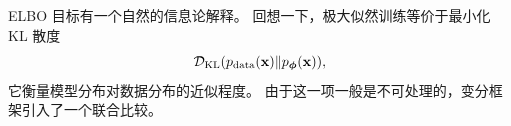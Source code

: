 






ELBO 目标有一个自然的信息论解释。
回想一下，极大似然训练等价于最小化 KL 散度
\[
\mathcal{D}_{\mathrm{KL}}(p_{\text{data}}({\mathbf{x}}) \| p_{\bm{\phi}}({\mathbf{x}})),
\]
它衡量模型分布对数据分布的近似程度。
由于这一项一般是不可处理的，变分框架引入了一个联合比较。

